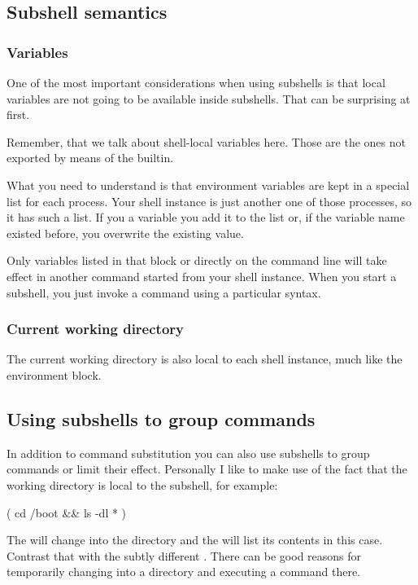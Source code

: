 \documentclass{olli-handout}
\begin{document}
\subsection{Subshell semantics}

\subsubsection{Variables}

One of the most important considerations when using subshells is that local variables are not going to be available inside subshells. That can be surprising at first.

Remember, that we talk about shell-local variables here. Those are the ones not exported by means of the  builtin.

What you need to understand is that environment variables are kept in a special list for each process. Your shell instance is just another one of those processes, so it has such a list. If you  a variable you add it to the list or, if the variable name existed before, you overwrite the existing value.

Only variables listed in that block or directly on the command line will take effect in another command started from your shell instance. When you start a subshell, you just invoke a command using a particular syntax.

\subsubsection{Current working directory}

The current working directory is also local to each shell instance, much like the environment block.

\subsection{Using subshells to group commands}

In addition to command substitution you can also use subshells to group commands or limit their effect. Personally I like to make use of the fact that the working directory is local to the subshell, for example:

\begin{lstbash}
( cd /boot && ls -dl * )
\end{lstbash}

The  will change into the directory and the  will list its contents in this case. Contrast that with the subtly different . There can be good reasons for temporarily changing into a directory and executing a command there.
\end{document}
